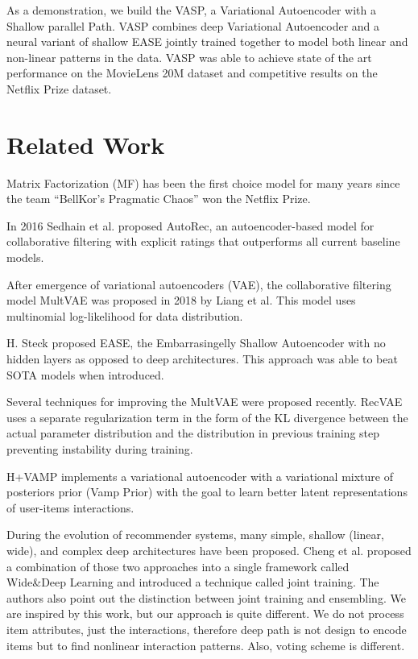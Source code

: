 \documentclass[conference]{IEEEtran}
\begin{document}
    As a demonstration, we build the VASP, a Variational Autoencoder with a Shallow parallel Path. VASP combines deep Variational Autoencoder and a neural variant of shallow EASE jointly trained together to model both linear and non-linear patterns in the data. VASP was able to achieve state of the art performance on the MovieLens 20M dataset and competitive results on the Netflix Prize dataset.
  


  
\section{Related Work}

    





        Matrix Factorization (MF) has been the first choice model for many years since the team “BellKor’s Pragmatic Chaos” won the Netflix Prize\cite{Koren2009}. 
        
        In 2016 Sedhain et al. proposed AutoRec\cite{Sedhain2015}, an autoencoder-based model for collaborative filtering with explicit ratings that outperforms all current baseline models.
        
        After emergence of variational autoencoders (VAE), the collaborative filtering model MultVAE was proposed in 2018 by Liang et al.\cite{Liang2018} This model uses multinomial log-likelihood for data distribution. 
        
        H. Steck proposed EASE\cite{Steck2019}, the Embarrasingelly Shallow Autoencoder with no hidden layers as opposed to deep architectures. This approach was able to beat SOTA models when introduced.
        
        Several techniques for improving the MultVAE were proposed recently. RecVAE\cite{Shenbin2020} uses a separate regularization term in the form of the KL divergence between the actual parameter distribution and the distribution in previous training step preventing instability during training. 
        
        H+VAMP\cite{Kim2019} implements a variational autoencoder with a variational mixture of posteriors prior (Vamp Prior) with the goal to learn better latent representations of user-items interactions.
     


        During the evolution of recommender systems, many simple, shallow (linear, wide), and complex deep architectures have been proposed. Cheng et al. proposed a combination of those two approaches into a single framework called Wide\&Deep Learning \cite{Cheng2016} and introduced a technique called joint training. The authors also point out the distinction between joint training and ensembling. We are inspired by this work, but our approach is quite different. We do not process item attributes, just the interactions, therefore deep path is not design to encode items but to find nonlinear interaction patterns. Also, voting scheme is different.
        
\end{document}
